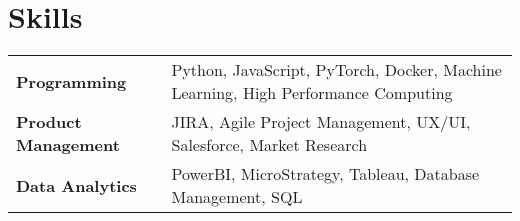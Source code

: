 \documentclass[a4paper,12pt]{article}
\begin{document}
\section{Skills}
\begin{tabularx}{\linewidth}{@{}l X@{}}
\textbf{Programming} &  \normalsize{Python, JavaScript, PyTorch, Docker, Machine Learning, High Performance Computing}\\
\textbf{Product Management}  &  \normalsize{JIRA, Agile Project Management, UX/UI, Salesforce, Market Research}\\  
\textbf{Data Analytics}  &  \normalsize{PowerBI, MicroStrategy, Tableau, Database Management, SQL}\\ 
\end{tabularx}

\vfill
{}
\end{document}

